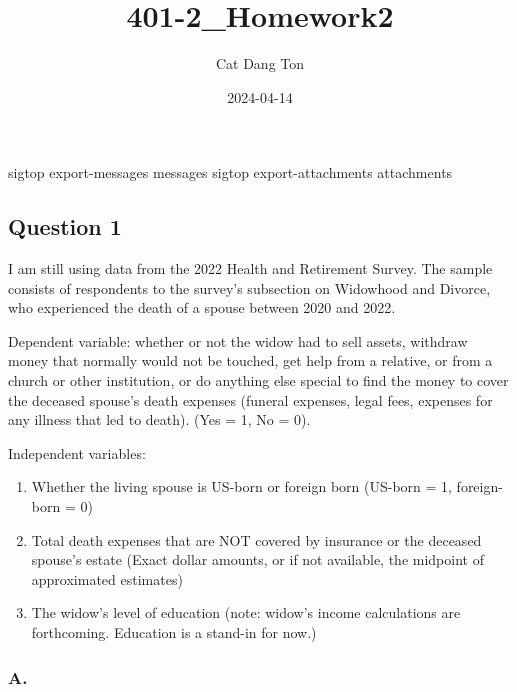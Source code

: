 \documentclass[
  letterpaper,
  DIV=11,
  numbers=noendperiod]{scrartcl}
\title{401-2\_Homework2}
\author{Cat Dang Ton}
\date{2024-04-14}
\providecommand{\tightlist}{%
  \setlength{\itemsep}{0pt}\setlength{\parskip}{0pt}}\usepackage{longtable,booktabs,array}
\begin{document}
\maketitle

sigtop export-messages messages sigtop export-attachments attachments

\subsection{Question 1}\label{question-1}

I am still using data from the 2022 Health and Retirement Survey. The
sample consists of respondents to the survey's subsection on Widowhood
and Divorce, who experienced the death of a spouse between 2020 and
2022.

Dependent variable: whether or not the widow had to sell assets,
withdraw money that normally would not be touched, get help from a
relative, or from a church or other institution, or do anything else
special to find the money to cover the deceased spouse's death expenses
(funeral expenses, legal fees, expenses for any illness that led to
death). (Yes = 1, No = 0).

Independent variables:

\begin{enumerate}
\def\labelenumi{\arabic{enumi}.}
\tightlist
\item
  Whether the living spouse is US-born or foreign born (US-born = 1,
  foreign-born = 0)
\item
  Total death expenses that are NOT covered by insurance or the deceased
  spouse's estate (Exact dollar amounts, or if not available, the
  midpoint of approximated estimates)
\item
  The widow's level of education (note: widow's income calculations are
  forthcoming. Education is a stand-in for now.)
\end{enumerate}

\subsubsection{A.}\label{a.}
\end{document}
